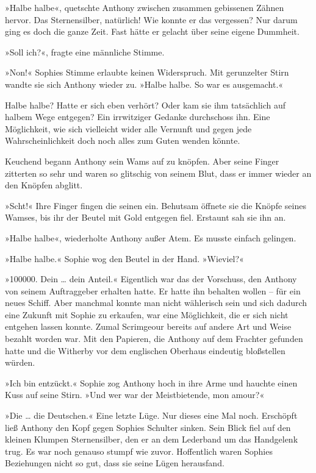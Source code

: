 »Halbe halbe«, quetschte Anthony zwischen zusammen gebissenen
Zähnen hervor. Das Sternensilber, natürlich! Wie konnte er das
vergessen? Nur darum ging es doch die ganze Zeit. Fast hätte er
gelacht über seine eigene Dummheit.

»Soll ich?«, fragte eine männliche Stimme.

»Non!« Sophies Stimme erlaubte keinen Widerspruch. Mit gerunzelter
Stirn wandte sie sich Anthony wieder zu. »Halbe halbe. So war es
ausgemacht.«

Halbe halbe? Hatte er sich eben verhört? Oder kam sie ihm
tatsächlich auf halbem Wege entgegen? Ein irrwitziger Gedanke
durchschoss ihn. Eine Möglichkeit, wie sich vielleicht wider alle
Vernunft und gegen jede Wahrscheinlichkeit doch noch alles zum
Guten wenden könnte.

Keuchend begann Anthony sein Wams auf zu knöpfen. Aber seine Finger
zitterten so sehr und waren so glitschig von seinem Blut, dass er
immer wieder an den Knöpfen abglitt.

»Scht!« Ihre Finger fingen die seinen ein. Behutsam öffnete sie die
Knöpfe seines Wamses, bis ihr der Beutel mit Gold entgegen fiel.
Erstaunt sah sie ihn an.

»Halbe halbe«, wiederholte Anthony außer Atem. Es musste einfach
gelingen.

»Halbe halbe.« Sophie wog den Beutel in der Hand. »Wieviel?«

»100000. Dein … dein Anteil.« Eigentlich war das der Vorschuss, den
Anthony von seinem Auftraggeber erhalten hatte. Er hatte ihn
behalten wollen – für ein neues Schiff. Aber manchmal konnte man
nicht wählerisch sein und sich dadurch eine Zukunft mit Sophie zu
erkaufen, war eine Möglichkeit, die er sich nicht entgehen lassen
konnte. Zumal Scrimgeour bereits auf andere Art und Weise bezahlt
worden war. Mit den Papieren, die Anthony auf dem Frachter gefunden
hatte und die Witherby vor dem englischen Oberhaus eindeutig
bloßstellen würden.

»Ich bin entzückt.« Sophie zog Anthony hoch in ihre Arme und
hauchte einen Kuss auf seine Stirn. »Und wer war der Meistbietende,
mon amour?«

»Die … die Deutschen.« Eine letzte Lüge. Nur dieses eine Mal noch.
Erschöpft ließ Anthony den Kopf gegen Sophies Schulter sinken. Sein
Blick fiel auf den kleinen Klumpen Sternensilber, den er an dem
Lederband um das Handgelenk trug. Es war noch genauso stumpf wie
zuvor. Hoffentlich waren Sophies Beziehungen nicht so gut, dass sie
seine Lügen herausfand.

